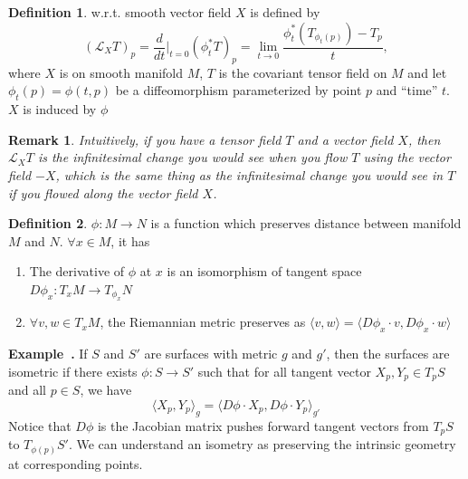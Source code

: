 \documentclass[a4paper]{article}
\theoremstyle{definition}
\newtheorem{definition}{Definition}
\theoremstyle{plain}
\newtheorem{remark}{Remark}
\newcounter{example}{Example}
\newenvironment{example}[1][]{\refstepcounter{example}\par\medskip
   \noindent \textbf{Example~\theexample. #1} \rmfamily}{\medskip}
\begin{document}
\begin{definition}
 w.r.t. smooth vector field $X$ is defined by
\begin{equation*}
    (\mathcal{L}_XT)_p=\frac{d}{dt}\bigg\rvert_{t=0}(\phi^*_tT)_p=\lim_{t\rightarrow0}\frac{\phi^*_t(T_{\phi_t(p)})-T_p}{t},
\end{equation*}
where $X$ is on smooth manifold $M$, $T$ is the covariant tensor field on $M$ and let $\phi_t(p)=\phi(t,p)$ be a diffeomorphism parameterized by point $p$ and ``time'' $t$. $X$ is induced by $\phi$
\end{definition}

\begin{remark}
Intuitively, if you have a tensor field $T$ and a vector field $X$, then $\mathcal{L}_XT$ is the infinitesimal change you would see when you flow $T$ using the vector field $-X$, which is the same thing as the infinitesimal change you would see in $T$ if you flowed along the vector field $X$.
\end{remark}

\begin{definition}\label{def:isometry}
 $\phi:M\rightarrow N$ is a function which preserves distance between manifold $M$ and $N$. $\forall x\in M$, it has
\begin{enumerate}
    \item The derivative of $\phi$ at $x$ is an isomorphism of tangent space $D\phi_x:T_xM\rightarrow T_{\phi_x}N$
    \item $\forall v,w \in T_xM$, the Riemannian metric preserves as $\langle v,w\rangle=\langle D\phi_x\cdot v,D\phi_x\cdot w\rangle$
\end{enumerate}
\end{definition}

\begin{example}\cite{stanford3}
If $S$ and $S'$ are surfaces with metric $g$ and $g'$, then the surfaces are isometric if there exists $\phi:S\rightarrow S'$ such that for all tangent vector $X_p,Y_p\in T_pS$ and all $p\in S$, we have
\begin{equation*}
    \langle X_p,Y_p\rangle_g=\langle D\phi\cdot X_p,D\phi\cdot Y_p\rangle_{g'}
\end{equation*}
Notice that $D\phi$ is the Jacobian matrix pushes forward tangent vectors from $T_pS$ to $T_{\phi(p)}S'$. We can understand an isometry as preserving the intrinsic geometry at corresponding points.
\end{example}
\end{document}
